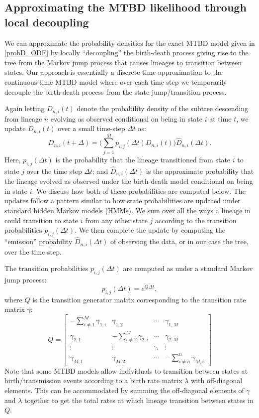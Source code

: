 \documentclass[10pt]{article}
\begin{document}
\subsection*{Approximating the MTBD likelihood through local decoupling}

We can approximate the probability densities for the exact MTBD model given in \eqref{probD_ODE} by locally ``decoupling'' the birth-death process giving rise to the tree from the Markov jump process that causes lineages to transition between states. Our approach is essentially a discrete-time approximation to the continuous-time MTBD model where over each time step we temporarily decouple the birth-death process from the state jump/transition process.

Again letting $D_{n,i}(t)$ denote the probability density of the subtree descending from lineage $n$ evolving as observed conditional on being in state $i$ at time $t$, we update $D_{n,i}(t)$ over a small time-step $\Delta t$ as:
\begin{equation} \label{approx_D_updatte}
	D_{n,i}(t + \Delta) = \bigg( \sum_{j=1}^{M} p_{i,j}(\Delta t) D_{n,i}(t) \bigg)  \hat{D}_{n,i}(\Delta t).
\end{equation}
Here, $p_{i,j}(\Delta t)$ is the probability that the lineage transitioned from state $i$ to state $j$ over the time step $\Delta t$; and $\hat{D}_{n,i}(\Delta t)$ is the approximate probability that the lineage evolved as observed under the birth-death model conditional on being in state $i$. We discuss how both of these probabilities are computed below. The updates follow a pattern similar to how state probabilities are updated under standard hidden Markov models (HMMs). We sum over all the ways a lineage in could transition to state $i$ from any other state $j$ according to the transition probabilities $p_{i,j}(\Delta t)$. We then complete the update by computing the ``emission'' probability  $\hat{D}_{n,i}(\Delta t)$ of observing the data, or in our case the tree, over the time step.

The transition probabilities $p_{i,j}(\Delta t)$ are computed as under a standard Markov jump process:
$$
	p_{i,j}(\Delta t) = e^{Q \Delta t},
$$
where $Q$ is the transition generator matrix corresponding to the transition rate matrix $\gamma$:
$$
Q =
\begin{bmatrix} 
	-\sum_{i \neq 1}^{M} \gamma_{1,i} & \gamma_{1,2} & \cdots & \gamma_{1,M} \\ 
	\gamma_{2,1} & -\sum_{i \neq 2}^{M} \gamma_{2,i} & \cdots & \gamma_{2,M} \\ 
	\vdots & \vdots & \ddots & \vdots \\ 
	\gamma_{M,1} & \gamma_{M,2} & \cdots & -\sum_{i \neq n}^{n} \gamma_{M,i} 
\end{bmatrix}
$$
Note that some MTBD models allow individuals to transition between states at birth/transmission events according to a birth rate matrix $\lambda$ with off-diagonal elements. This can be accommodated by summing the off-diagonal elements of  
$\gamma$ and $\lambda$ together to get the total rates at which lineage transition between states in $Q$.
\end{document}
